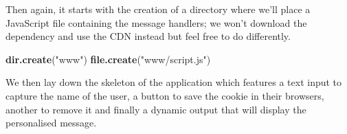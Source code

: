 \documentclass[10pt,]{krantz}
\makeatletter
\newenvironment{Shaded}{\begin{snugshade}}{\end{snugshade}}
\newcommand{\ControlFlowTok}[1]{\textcolor[rgb]{0.27,0.27,0.27}{\textbf{#1}}}
\newcommand{\DataTypeTok}[1]{\textcolor[rgb]{0.27,0.27,0.27}{#1}}
\newcommand{\KeywordTok}[1]{\textcolor[rgb]{0.27,0.27,0.27}{\textbf{#1}}}
\newcommand{\NormalTok}[1]{#1}
\newcommand{\OperatorTok}[1]{\textcolor[rgb]{0.43,0.43,0.43}{\textbf{#1}}}
\newcommand{\StringTok}[1]{\textcolor[rgb]{0.5,0.5,0.5}{#1}}
\newenvironment{kframe}{%
\medskip{}
\setlength{\fboxsep}{.8em}
 \def\at@end@of@kframe{}%
 \ifinner\ifhmode%
  \def\at@end@of@kframe{\end{minipage}}%
  \begin{minipage}{\columnwidth}%
 \fi\fi%
 \def\FrameCommand##1{\hskip\@totalleftmargin \hskip-\fboxsep
 \colorbox{shadecolor}{##1}\hskip-\fboxsep
     \hskip-\linewidth \hskip-\@totalleftmargin \hskip\columnwidth}%
 \MakeFramed {\advance\hsize-\width
   \@totalleftmargin\z@ \linewidth\hsize
   \@setminipage}}%
 {\par\unskip\endMakeFramed%
 \at@end@of@kframe}
\renewenvironment{Shaded}{\begin{kframe}}{\end{kframe}}
\makeatother
\begin{document}
Then again, it starts with the creation of a directory where we'll place a JavaScript file containing the message handlers; we won't download the dependency and use the CDN instead but feel free to do differently.

\begin{Shaded}
\begin{Highlighting}[]
\KeywordTok{dir.create}\NormalTok{(}\StringTok{"www"}\NormalTok{)}
\KeywordTok{file.create}\NormalTok{(}\StringTok{"www/script.js"}\NormalTok{)}
\end{Highlighting}
\end{Shaded}

We then lay down the skeleton of the application which features a text input to capture the name of the user, a button to save the cookie in their browsers, another to remove it and finally a dynamic output that will display the personalised message.

\begin{Shaded}
\end{Shaded}
\end{document}

